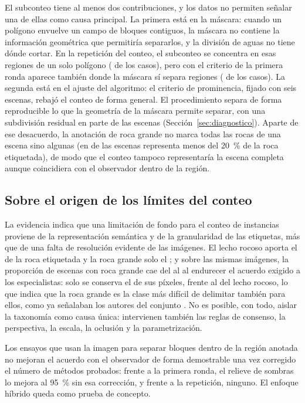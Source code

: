 El subconteo tiene al menos dos contribuciones, y los datos no permiten señalar una de ellas como
causa principal. La primera está en la máscara: cuando un polígono envuelve un campo de bloques
contiguos, la máscara no contiene la información geométrica que permitiría separarlos, y la
división de aguas no tiene dónde cortar. En la repetición del conteo, el subconteo se concentra en
esas regiones de un solo polígono (\cVSegRegUnaAbajo{} de los \cVSegAbajo{} casos), pero con el
criterio de la primera ronda aparece también donde la máscara sí separa regiones
(\cVRegVariasAbajo{} de los \cVAbajo{} casos). La segunda está en el ajuste del algoritmo: el
criterio de prominencia, fijado con seis escenas, rebajó el conteo de forma general. El
procedimiento separa de forma reproducible lo que la geometría de la máscara permite separar, con
una subdivisión residual en parte de las escenas (Sección~\ref{sec:diagnostico}). Aparte de ese
desacuerdo, la anotación de roca grande no marca todas las rocas de una
escena sino algunas (en \cVNoExhN{} de las \cVN{} escenas representa menos del
\SI{20}{\percent} de la roca etiquetada), de modo que el conteo tampoco representaría la escena
completa aunque coincidiera con el observador dentro de la región.

\subsection{Sobre el origen de los límites del conteo}

La evidencia indica que una limitación de fondo para el conteo de instancias proviene de la
representación semántica y de la granularidad de las etiquetas, más que de una falta de
resolución evidente de las imágenes. El lecho rocoso aporta el \cParteBed{} de la roca
etiquetada y la roca grande solo el \cParteBig; y sobre las mismas \cNGold{} imágenes, la
proporción de escenas con roca grande cae del \cGoldUnoBig{} al \cGoldTresBig{} al endurecer el
acuerdo exigido a los especialistas: solo se conserva el \cConsBig{} de sus píxeles, frente al
\cConsBed{} del lecho rocoso, lo que indica que la roca grande es la clase más difícil de
delimitar también para ellos, como ya señalaban los autores del conjunto
\citep{swan2021ai4mars}. No es posible, con todo, aislar la taxonomía como causa única: intervienen
también las reglas de consenso, la perspectiva, la escala, la oclusión y la parametrización.

Los ensayos que usan la imagen para separar bloques dentro de la región anotada no mejoran el
acuerdo con el observador de forma demostrable una vez corregido el número de métodos probados:
frente a la primera ronda, el relieve de sombras lo mejora al \SI{95}{\percent} sin esa
corrección, y frente a la repetición, ninguno.
El enfoque híbrido queda como prueba de concepto.

